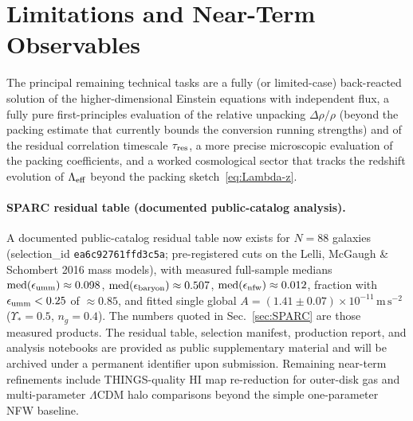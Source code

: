 \documentclass[11pt,a4paper]{article}
\begin{document}
\section{Limitations and Near-Term Observables}
\label{sec:limitations}

The principal remaining technical tasks are a fully (or limited-case) back-reacted solution of the higher-dimensional Einstein equations with independent flux, a fully pure first-principles evaluation of the relative unpacking \(\Delta\rho/\rho\) (beyond the packing estimate that currently bounds the conversion running strengths) and of the residual correlation timescale \(\tau_{\rm res}\), a more precise microscopic evaluation of the packing coefficients, and a worked cosmological sector that tracks the redshift evolution of \(\Lambda_{\rm eff}\) beyond the packing sketch~\eqref{eq:Lambda-z}.

\paragraph{SPARC residual table (documented public-catalog analysis).}
A documented public-catalog residual table now exists for \(N=88\) galaxies (selection\_id \texttt{ea6c92761ffd3c5a}; pre-registered cuts on the Lelli, McGaugh \& Schombert 2016 mass models), with measured full-sample medians \(\mathrm{med}(\epsilon_{\rm umm})\approx 0.098\), \(\mathrm{med}(\epsilon_{\rm baryon})\approx 0.507\), \(\mathrm{med}(\epsilon_{\rm nfw})\approx 0.012\), fraction with \(\epsilon_{\rm umm}<0.25\) of \(\approx 0.85\), and fitted single global \(A=(1.41\pm 0.07)\times 10^{-11}\,\mathrm{m\,s^{-2}}\) (\(\Upsilon_*=0.5\), \(n_g=0.4\)). The numbers quoted in Sec.~\ref{sec:SPARC} are those measured products. The residual table, selection manifest, production report, and analysis notebooks are provided as public supplementary material and will be archived under a permanent identifier upon submission. Remaining near-term refinements include THINGS-quality HI map re-reduction for outer-disk gas \cite{Walter2008} and multi-parameter \(\Lambda\)CDM halo comparisons beyond the simple one-parameter NFW baseline.
\end{document}
